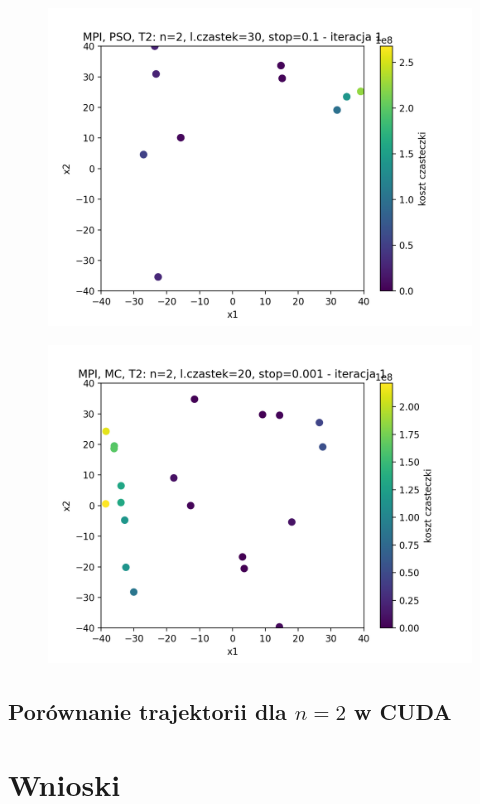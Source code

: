 \documentclass[11pt, a4paper, oneside]{article}
\begin{document}
\begin{figure}[H]
\centering
\begin{minipage}[b]{\dimexpr.5\textwidth-1em}
  \centering
  \includegraphics[width=1\linewidth]{grafiki2/MPI_PSO_T2/MPI_PSO_T2_startPositions.png}
  \label{fig:pozycjeStartowe:PSO2}
\end{minipage} \hfill
\begin{minipage}[b]{\dimexpr.5\textwidth-1em}
  \centering
  \includegraphics[width=1\linewidth]{grafiki2/MPI_MC_T2/MPI_MC_T2_startPositions.png}
  \label{fig:pozycjeStartowe:MC2}
\end{minipage}
\end{figure}



\subsection{Porównanie trajektorii dla $n = 2$ w CUDA}


\section{Wnioski} 



{}

\end{document}
